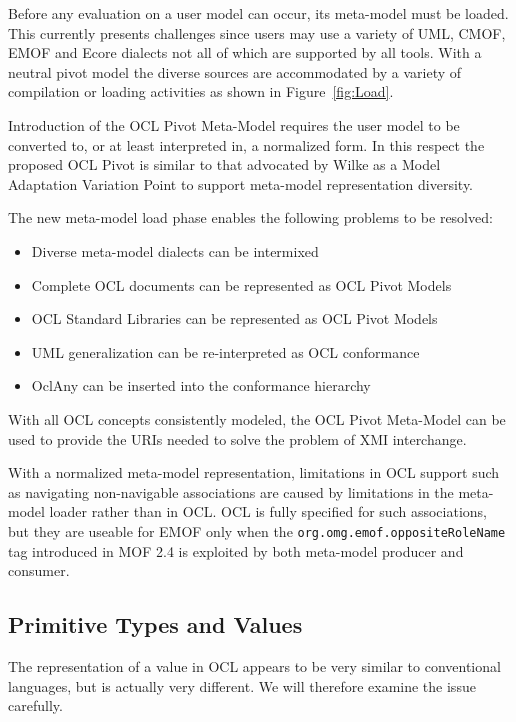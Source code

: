 \documentclass{eceasst}
\begin{document}
Before any evaluation on a user model can occur, its meta-model must be loaded. This currently presents challenges since users may use a variety of UML, CMOF, EMOF and Ecore dialects not all of which are supported by all tools. With a neutral pivot model the diverse sources are accommodated by a variety of compilation or loading activities as shown in Figure~\ref{fig:Load}.

Introduction of the OCL Pivot Meta-Model requires the user model to be converted to, or at least interpreted in, a normalized form. In this respect the proposed OCL Pivot is similar to that advocated by Wilke\cite{Variability} as a Model Adaptation Variation Point to support meta-model representation diversity.

The new meta-model load phase enables the following problems to be resolved:

\begin{itemize}
\item Diverse meta-model dialects can be intermixed
\item Complete OCL documents can be represented as OCL Pivot Models
\item OCL Standard Libraries can be represented as OCL Pivot Models
\item UML generalization can be re-interpreted as OCL conformance
\item OclAny can be inserted into the conformance hierarchy
\end{itemize}

With all OCL concepts consistently modeled, the OCL Pivot Meta-Model can be used to provide the URIs needed to solve the problem of XMI interchange.

With a normalized meta-model representation, limitations in OCL support such as navigating non-navigable associations are caused by limitations in the meta-model loader rather than in OCL. OCL is fully specified for such associations, but they are useable for EMOF only when the \verb|org.omg.emof.oppositeRoleName| tag introduced in MOF 2.4\cite{MOF-2.4} is exploited by both meta-model producer and consumer.

\subsection{Primitive Types and Values}\label{Values}

The representation of a value in OCL appears to be very similar to conventional languages, but is actually very different. We will therefore examine the issue carefully.
\end{document}
